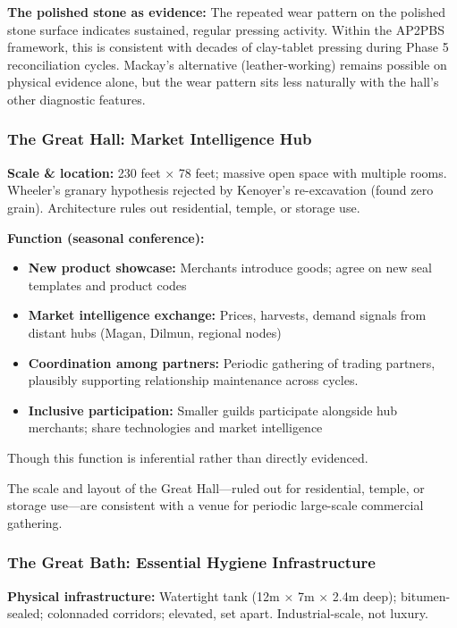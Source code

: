 \documentclass[12pt]{article}
\begin{document}
\textbf{The polished stone as evidence:} The repeated wear pattern on the polished 
stone surface indicates sustained, regular pressing activity. Within the AP2PBS 
framework, this is consistent with decades of clay-tablet pressing during Phase 5 
reconciliation cycles. Mackay's alternative (leather-working) remains possible on 
physical evidence alone, but the wear pattern sits less naturally with the hall's 
other diagnostic features.

\subsubsection{The Great Hall: Market Intelligence Hub}

\textbf{Scale \& location:} 230 feet × 78 feet; massive open space with multiple
rooms. Wheeler's granary hypothesis rejected by Kenoyer's re-excavation (found
zero grain). Architecture rules out residential, temple, or storage use.

\textbf{Function (seasonal conference):}
\begin{itemize}
\item \textbf{New product showcase:} Merchants introduce goods; agree on new
seal templates and product codes
\item \textbf{Market intelligence exchange:} Prices, harvests, demand signals
        from distant hubs (Magan, Dilmun, regional nodes)
\item \textbf{Coordination among partners:} Periodic gathering of trading
        partners, plausibly supporting relationship maintenance across
        cycles.
\item \textbf{Inclusive participation:} Smaller guilds participate alongside
        hub merchants; share technologies and market intelligence
\end{itemize}

Though this function is inferential rather than directly evidenced.

The scale and layout of the Great Hall---ruled out for residential, temple,
or storage use---are consistent with a venue for periodic large-scale
commercial gathering.

\subsubsection{The Great Bath: Essential Hygiene Infrastructure}

\textbf{Physical infrastructure:} Watertight tank (12m × 7m × 2.4m deep);
bitumen-sealed; colonnaded corridors; elevated, set apart. Industrial-scale,
not luxury.
\end{document}
